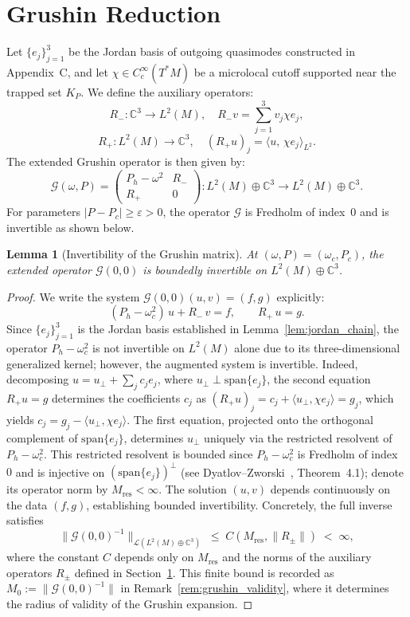 \documentclass[12pt,a4paper]{amsart}
\newtheorem{lemma}[theorem]{Lemma}
\theoremstyle{remark}
\begin{document}
\section{Grushin Reduction}
\label{sec:grushin}

Let $\{e_j\}_{j=1}^3$ be the Jordan basis of outgoing quasimodes constructed in
Appendix~C, and let $\chi \in C_c^\infty(T^*M)$ be a microlocal cutoff supported
near the trapped set $K_P$. We define the auxiliary operators:
\[
  R_- : \mathbb{C}^3 \to L^2(M),
  \quad
  R_- v = \sum_{j=1}^3 v_j \chi e_j,
\]
\[
  R_+ : L^2(M) \to \mathbb{C}^3,
  \quad
  (R_+ u)_j = \langle u,\, \chi e_j \rangle_{L^2}.
\]
The extended Grushin operator is then given by:
\[
  \mathcal{G}(\omega, P) =
  \begin{pmatrix} P_h - \omega^2 & R_- \\ R_+ & 0 \end{pmatrix}
  : L^2(M) \oplus \mathbb{C}^3 \to L^2(M) \oplus \mathbb{C}^3.
\]
For parameters $|P - P_c| \geq \varepsilon > 0$, the operator $\mathcal{G}$ is Fredholm of index~$0$ and
is invertible as shown below.

\begin{lemma}[Invertibility of the Grushin matrix]
\label{lem:grushin_invertible}
At $(\omega, P) = (\omega_c, P_c)$, the extended operator $\mathcal{G}(0,0)$ is
boundedly invertible on $L^2(M) \oplus \mathbb{C}^3$.
\end{lemma}

\begin{proof}
We write the system $\mathcal{G}(0,0)(u,v) = (f,g)$ explicitly:
\[
  (P_h - \omega_c^2)\,u + R_-\,v = f,
  \qquad
  R_+\,u = g.
\]
Since $\{e_j\}_{j=1}^3$ is the Jordan basis established in Lemma~\ref{lem:jordan_chain},
the operator $P_h - \omega_c^2$ is not invertible on $L^2(M)$ alone due to
its three-dimensional generalized kernel; however, the augmented system is invertible.
Indeed, decomposing $u = u_\perp + \sum_j c_j e_j$, where $u_\perp \perp \mathrm{span}\{e_j\}$,
the second equation $R_+u = g$ determines the coefficients $c_j$ as $(R_+u)_j = c_j + \langle u_\perp, \chi e_j\rangle = g_j$,
which yields $c_j = g_j - \langle u_\perp, \chi e_j\rangle$.
The first equation, projected onto the orthogonal complement of $\mathrm{span}\{e_j\}$, determines $u_\perp$
uniquely via the restricted resolvent of $P_h - \omega_c^2$.
This restricted resolvent is bounded since $P_h - \omega_c^2$ is Fredholm of index~$0$ and
is injective on $(\mathrm{span}\{e_j\})^\perp$ (see Dyatlov--Zworski~\cite{DZ19}, Theorem~4.1);
denote its operator norm by $M_{\mathrm{res}} < \infty$.
The solution $(u,v)$ depends continuously on the data $(f,g)$, establishing bounded invertibility.
Concretely, the full inverse satisfies
\[
  \|\mathcal{G}(0,0)^{-1}\|_{\mathcal{L}(L^2(M)\oplus\mathbb{C}^3)}
  \;\leq\; C(M_{\mathrm{res}},\|R_\pm\|) \;<\; \infty,
\]
where the constant $C$ depends only on $M_{\mathrm{res}}$ and the norms of the auxiliary operators
$R_\pm$ defined in Section~\ref{sec:grushin}.
This finite bound is recorded as
$M_0 := \|\mathcal{G}(0,0)^{-1}\|$ in Remark~\ref{rem:grushin_validity},
where it determines the radius of validity of the Grushin expansion.
\end{proof}
\end{document}
